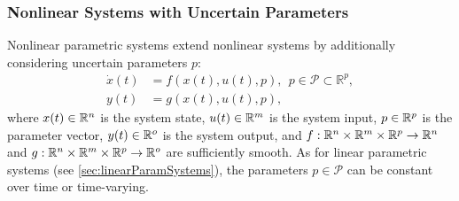 \subsubsection{Nonlinear Systems with Uncertain Parameters} \label{sec:nonlinearParamSystems}

Nonlinear parametric systems extend nonlinear systems by additionally considering uncertain parameters $p$:
\begin{align}
	\dot{x}(t) &= f(x(t),u(t),p), ~~ p\in \mathcal{P} \subset \mathbb{R}^{p},	\label{eq:nonlinParamSystem} \\
	y(t) &= g(x(t),u(t),p) \label{eq:nonlinParamSystem_output},
\end{align} 
where $x(t) \in \mathbb{R}^n$ is the system state, $u(t) \in \mathbb{R}^m$ is the system input, $p \in \mathbb{R}^p$ is the parameter vector, $y(t) \in \mathbb{R}^o$ is the system output, and $f: \mathbb{R}^n \times \mathbb{R}^m \times \mathbb{R}^p \to \mathbb{R}^n$ and $g: \mathbb{R}^n \times \mathbb{R}^m \times \mathbb{R}^p \to \mathbb{R}^o$ are sufficiently smooth. As for linear parametric systems (see \cref{sec:linearParamSystems}), the parameters $p \in \mathcal{P}$ can be constant over time or time-varying.

